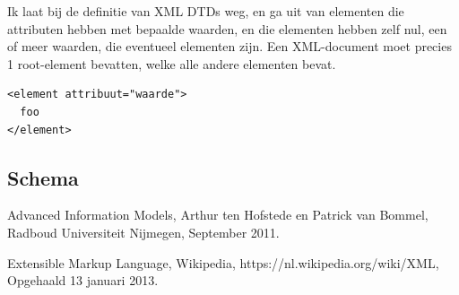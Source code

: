 \documentclass[11pt]{article}
\begin{document}
Ik laat bij de definitie van XML DTDs weg, en ga uit van elementen die
attributen hebben met bepaalde waarden, en die elementen hebben zelf nul, een
of meer waarden, die eventueel elementen zijn. Een XML-document moet precies
1 root-element bevatten, welke alle andere elementen bevat.

\begin{verbatim}
<element attribuut="waarde">
  foo
</element>
\end{verbatim} 

\subsection{Schema}

\begin{thebibliography}{9}
    Advanced Information Models, 
    Arthur ten Hofstede en Patrick van Bommel,
    Radboud Universiteit Nijmegen,
    September 2011.

    Extensible Markup Language,
    Wikipedia,
    https://nl.wikipedia.org/wiki/XML,
    Opgehaald 13 januari 2013.
\end{thebibliography}
\end{document}
